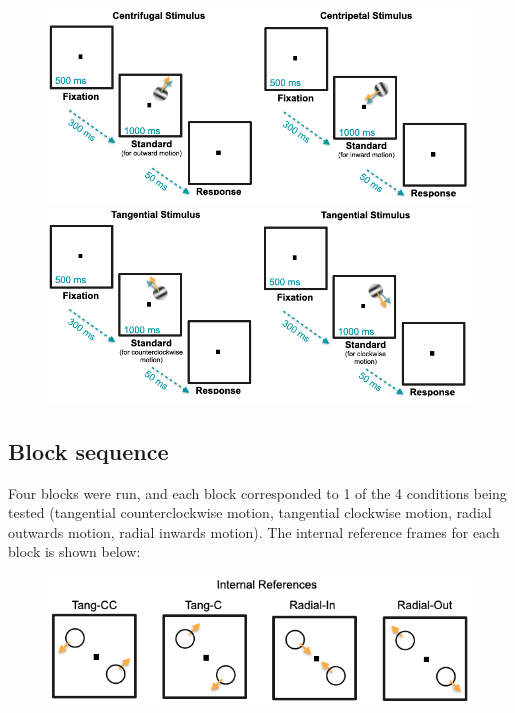 \documentclass[11pt]{article} %
\begin{document}
\begin{figure}[H]
\centering %
\includegraphics[scale=.4]{Images/Radial_sequence.png}
\\
\includegraphics[scale=.4]{Images/Tang_sequence.png}
\end{figure}

\subsection{Block sequence}
Four blocks were run, and each block corresponded to 1 of the 4 conditions being tested (tangential counterclockwise motion, tangential clockwise motion, radial outwards motion, radial inwards motion). The internal reference frames for each block is shown below:

\begin{figure}[H]
\centering %
\includegraphics[scale=.4]{Images/Blocks.png}
\end{figure}
\end{document}
